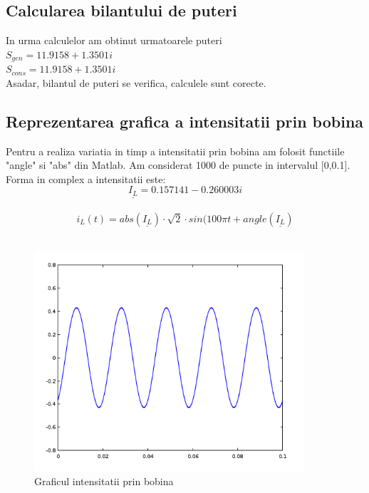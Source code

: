 \documentclass[12pt,titlepage,a4paper]{article}
\begin{document}
\subsection{Calcularea bilantului de puteri}
In urma calculelor am obtinut urmatoarele puteri\\

$S_{gen} = 11.9158 +  1.3501i$\\

$S_{cons} = 11.9158 +  1.3501i$\\

Asadar, bilantul de puteri se verifica, calculele sunt corecte.


\subsection{Reprezentarea grafica a intensitatii prin bobina}

Pentru a realiza variatia in timp a intensitatii prin bobina am folosit functiile "angle" si "abs" din Matlab. Am considerat 1000 de puncte in intervalul [0,0.1]. Forma in complex a intensitatii este: \\

$$\underline{I_L} = 0.157141 - 0.260003i$$\\

$$i_L(t) = abs(\underline{I_L}) \cdot \sqrt{2} \cdot sin(100\pi t + angle(\underline{I_L})$$\\
\begin{figure}[h!]
\begin{center} 
\hypertarget{C2}{}
\includegraphics[width=10cm]{ex1plot.PNG}
\caption{Graficul intensitatii prin bobina}\label{fig1a}
\end{center}
\end{figure}
\end{document}
